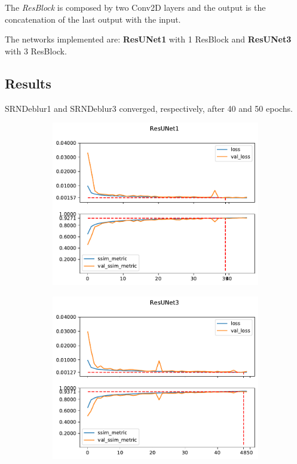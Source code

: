 The \textit{ResBlock} is composed by two Conv2D layers and the output is the concatenation of the last output with the input.  

The networks implemented are: \textbf{ResUNet1} with 1 ResBlock and \textbf{ResUNet3} with 3 ResBlock.


\subsection{Results}

SRNDeblur1 and SRNDeblur3 converged, respectively, after 40 and 50 epochs.

\begin{figure}
    \begin{subfigure}{\textwidth}
        \centering
        \includegraphics[height=0.4\textheight,keepaspectratio]{subsections/resunet/plot_history_ResUNet1.pdf}            
    \end{subfigure}
    \begin{subfigure}{\textwidth}
        \centering
        \includegraphics[height=0.4\textheight,keepaspectratio]{subsections/resunet/plot_history_ResUNet3.pdf}            
    \end{subfigure}
\end{figure}

